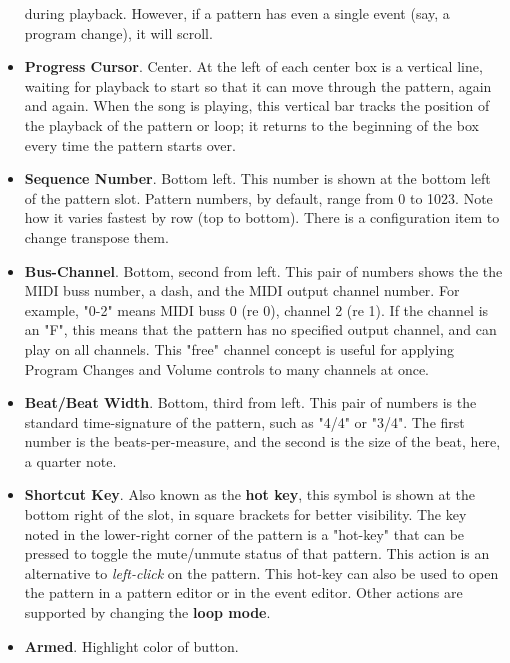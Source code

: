\begin{itemize}
         during playback.
         However, if a pattern has even a single event (say, a program change),
         it will scroll.
      \item \textbf{Progress Cursor}. Center.
         At the left of each center box is a vertical line, waiting for
         playback to start so that it can move through the pattern, again and
         again.
         When the song is playing, this vertical bar
         tracks the position of the playback of the pattern or loop; it
         returns to the beginning of the box every time the pattern starts
         over.
      \item \textbf{Sequence Number}. Bottom left.
         This number is shown at the bottom left of the pattern slot.
         Pattern numbers, by default, range from 0 to 1023.
         Note how it varies fastest by row (top to bottom).
         There is a configuration item to change transpose them.
      \item \textbf{Bus-Channel}. Bottom, second from left.
         This pair of numbers shows the the MIDI buss number, a dash, and
         the MIDI output channel number.
         For example, "0-2" means MIDI buss 0 (re 0), channel 2 (re 1).
         If the channel is an "F", this means that the pattern has no specified
         output channel, and can play on all channels.
         This "free" channel concept is useful for applying Program Changes and
         Volume controls to many channels at once.
      \item \textbf{Beat/Beat Width}. Bottom, third from left.
         This pair of numbers is the standard time-signature of the pattern,
         such as "4/4" or "3/4".  The first number is the beats-per-measure,
         and the second is the size of the beat, here, a quarter note.
      \item \textbf{Shortcut Key}.  Also known as the
         \textbf{hot key}, this symbol is shown at the bottom right of the
         slot, in square brackets for better visibility.
         The key noted in the lower-right corner of the pattern is a "hot-key"
         that can be pressed to toggle the mute/unmute status of that pattern.
         This action is an alternative to
         \textsl{left-click} on the pattern.
         This hot-key can also be used to open the pattern in a pattern editor
         or in the event editor.
         Other actions are supported by changing the 
         \textbf{loop mode}.
      \item \textbf{Armed}. Highlight color of button.

\end{itemize}
